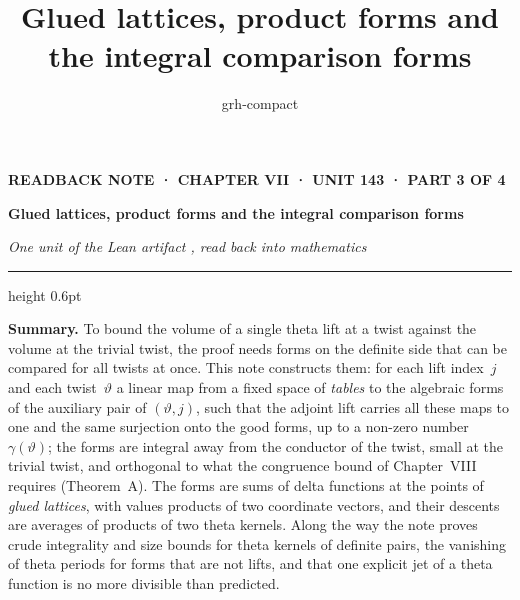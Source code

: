 \documentclass[11pt,a4paper]{article}
\title{Glued lattices, product forms and the integral comparison forms}
\author{grh-compact}
\date{}
\newcommand{\m}[1]{\mbox{$#1$}}        %
\theoremstyle{plainx}
\theoremstyle{uprightx}
\begin{document}
\color{ink}

{\raggedright
{\sffamily\bfseries\fontsize{7.2}{9}\selectfont\color{leancol}READBACK NOTE · CHAPTER VII · UNIT 143 · PART 3 OF 4\par}
\vspace{5pt}
{\fontsize{21.5}{25.5}\selectfont\bfseries Glued lattices, product forms and the integral comparison forms\par}
\vspace{5pt}
{\fontsize{12.4}{16}\selectfont\itshape\color{inksoft} One unit of the Lean artifact \ArtifactName, read back into
mathematics\par}}
\vspace{8pt}
{\color{rulegrey}\hrule height 0.6pt}
\vspace{7pt}
\thispagestyle{empty}

\textbf{Summary.} To bound the volume of a single theta lift at a twist against the volume at the trivial twist, the
proof needs forms on the definite side that can be compared for all twists at once. This note constructs them: for
each lift index~$j$ and each twist~$\vartheta$ a linear map from a fixed space of \emph{tables} to the algebraic
forms of the auxiliary pair of \m{(\vartheta,j)}, such that the adjoint lift carries all these maps to one and the
same surjection onto the good forms, up to a non-zero number \m{\gamma(\vartheta)}; the forms are integral away from
the conductor of the twist, small at the trivial twist, and orthogonal to what the congruence bound of Chapter~VIII
requires (Theorem~A). The forms are sums of delta functions at the points of \emph{glued lattices}, with values
products of two coordinate vectors, and their descents are averages of products of two theta kernels. Along the way
the note proves crude integrality and size bounds for theta kernels of definite pairs, the vanishing of theta periods
for forms that are not lifts, and that one explicit jet of a theta function is no more divisible than predicted.
\end{document}
